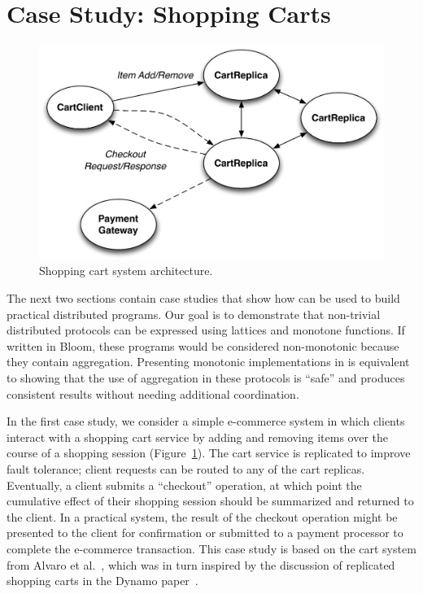 \section{Case Study: Shopping Carts}
\label{sec:carts}

\begin{figure}[t]
\includegraphics[width=\linewidth]{fig/cart_arch.pdf}
\caption{Shopping cart system architecture.}
\label{fig:cart-system-arch}
\end{figure}

The next two sections contain case studies that show how \lang can be used to
build practical distributed programs. Our goal is to demonstrate that
non-trivial distributed protocols can be expressed using lattices and monotone
functions. If written in Bloom, these programs would be considered non-monotonic
because they contain aggregation. Presenting monotonic implementations in \lang
is equivalent to showing that the use of aggregation in these protocols is
``safe'' and produces consistent results without needing additional
coordination.

In the first case study, we consider a simple e-commerce system in which clients
interact with a shopping cart service by adding and removing items over the
course of a shopping session (Figure~\ref{fig:cart-system-arch}). The cart service is
replicated to improve fault tolerance; client requests can be routed to any of
the cart replicas. Eventually, a client submits a ``checkout'' operation, at
which point the cumulative effect of their shopping session should be summarized
and returned to the client. In a practical system, the result of the checkout
operation might be presented to the client for confirmation or submitted to a
payment processor to complete the e-commerce transaction. This case study is
based on the cart system from Alvaro et al.~\cite{Alvaro2011}, which was in turn
inspired by the discussion of replicated shopping carts in the Dynamo
paper~\cite{DeCandia2007}.


